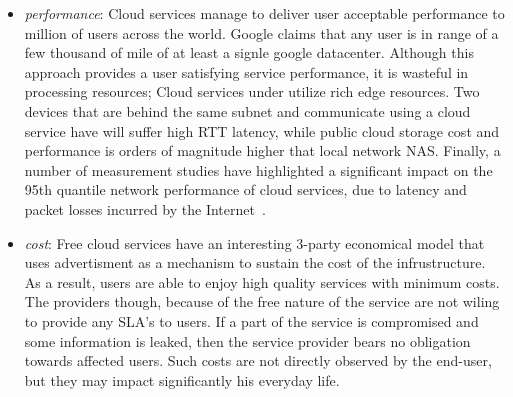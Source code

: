 \begin{itemize}
\item {\it performance}: Cloud services manage to deliver user
acceptable performance to million of users across the world. Google claims that any user is in
range of a few thousand of mile of at least a signle google datacenter. Although
this approach provides a user satisfying service performance, it is wasteful in
processing resources; Cloud services under utilize rich edge resources. Two
devices that are behind the same subnet and communicate using a cloud service 
have will suffer high RTT latency, while public cloud storage cost and
performance is orders of magnitude higher that local network NAS. 
Finally, a number of measurement studies have highlighted a significant impact
on the 95th quantile network performance of cloud services, due to latency and packet
losses incurred by the Internet~\cite{Wittie2010}. 

\item {\it cost}: Free cloud services have an interesting 3-party economical
      model that uses advertisment as a mechanism to sustain the cost of the
      infrustructure. As a result, users are able to enjoy high quality services
      with minimum costs. The providers though, because of the free nature of
      the service are not wiling to provide any SLA's to users. If a part of the
      service is compromised and some information is leaked, then the service
      provider bears no obligation towards affected users. Such costs are not
      directly observed by the end-user, but they may impact significantly his
      everyday life. 


\end{itemize}

